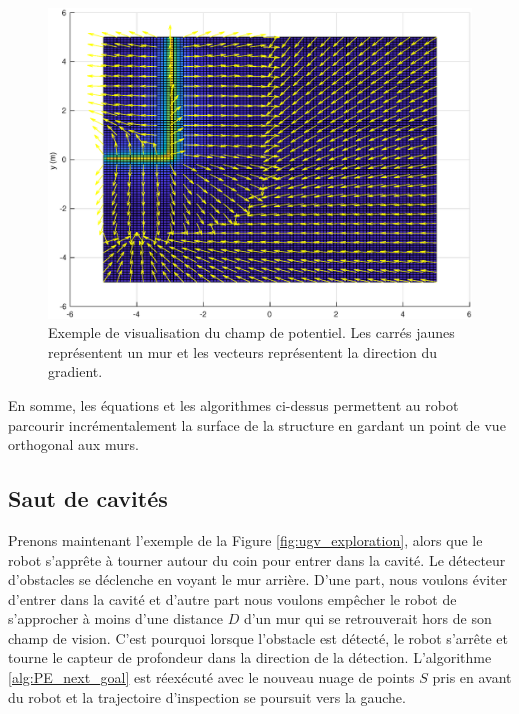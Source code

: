 \begin{figure}[ht]
  \centering
  \includegraphics[width=0.7\linewidth]{images/champ_de_potentiel.eps}
  \caption[Visualisation du champ de potentiel]{Exemple de visualisation du champ de potentiel. Les carrés jaunes représentent un mur et les vecteurs représentent la direction du gradient. }
  \label{fig:potential_field}
\end{figure}

En somme, les équations et les algorithmes ci-dessus permettent au robot parcourir incrémentalement la surface de la structure en gardant un point de vue orthogonal aux murs.

\subsection{Saut de cavités}
\label{subsec:ugv_cavity_skip}

Prenons maintenant l'exemple de la Figure \ref{fig:ugv_exploration}, alors que le robot s'apprête à tourner autour du coin pour entrer dans la cavité. Le détecteur d'obstacles se déclenche en voyant le mur arrière. D'une part, nous voulons éviter d'entrer dans la cavité et d'autre part nous voulons empêcher le robot de s'approcher à moins d'une distance $D$ d'un mur qui se retrouverait hors de son champ de vision. C'est pourquoi lorsque l'obstacle est détecté, le robot s'arrête et tourne le capteur de profondeur dans la direction de la détection. L'algorithme \ref{alg:PE_next_goal} est réexécuté avec le nouveau nuage de points $S$ pris en avant du robot et la trajectoire d'inspection se poursuit vers la gauche.


